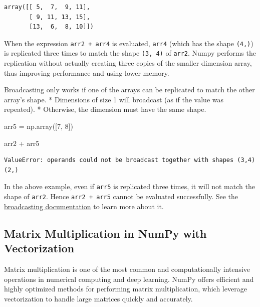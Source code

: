 \documentclass[
  letterpaper,
  DIV=11,
  numbers=noendperiod]{scrreprt}
\newenvironment{Shaded}{\begin{snugshade}}{\end{snugshade}}
\newcommand{\DecValTok}[1]{\textcolor[rgb]{0.68,0.00,0.00}{#1}}
\newcommand{\NormalTok}[1]{\textcolor[rgb]{0.00,0.23,0.31}{#1}}
\newcommand{\OperatorTok}[1]{\textcolor[rgb]{0.37,0.37,0.37}{#1}}
\begin{document}
\begin{verbatim}
array([[ 5,  7,  9, 11],
       [ 9, 11, 13, 15],
       [13,  6,  8, 10]])
\end{verbatim}

When the expression \texttt{arr2\ +\ arr4} is evaluated, \texttt{arr4}
(which has the shape \texttt{(4,)}) is replicated three times to match
the shape \texttt{(3,\ 4)} of \texttt{arr2}. Numpy performs the
replication without actually creating three copies of the smaller
dimension array, thus improving performance and using lower memory.

Broadcasting only works if one of the arrays can be replicated to match
the other array's shape. * Dimensions of size 1 will broadcast (as if
the value was repeated). * Otherwise, the dimension must have the same
shape.

\begin{Shaded}
\begin{Highlighting}[]
\NormalTok{arr5 }\OperatorTok{=}\NormalTok{ np.array([}\DecValTok{7}\NormalTok{, }\DecValTok{8}\NormalTok{])}
\end{Highlighting}
\end{Shaded}

\begin{Shaded}
\begin{Highlighting}[]
\NormalTok{arr2 }\OperatorTok{+}\NormalTok{ arr5}
\end{Highlighting}
\end{Shaded}

\begin{verbatim}
ValueError: operands could not be broadcast together with shapes (3,4) (2,) 
\end{verbatim}

In the above example, even if \texttt{arr5} is replicated three times,
it will not match the shape of \texttt{arr2}. Hence
\texttt{arr2\ +\ arr5} cannot be evaluated successfully. See the
\href{https://numpy.org/doc/stable/user/basics.broadcasting.html}{broadcasting
documentation} to learn more about it.

\hypertarget{matrix-multiplication-in-numpy-with-vectorization}{%
\subsection{Matrix Multiplication in NumPy with
Vectorization}\label{matrix-multiplication-in-numpy-with-vectorization}}

Matrix multiplication is one of the most common and computationally
intensive operations in numerical computing and deep learning. NumPy
offers efficient and highly optimized methods for performing matrix
multiplication, which leverage vectorization to handle large matrices
quickly and accurately.
\end{document}
